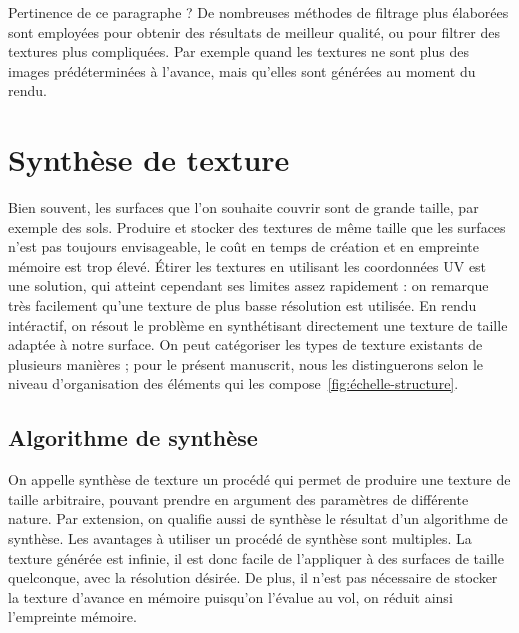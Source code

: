 {\color{red}Pertinence de ce paragraphe ?}
De nombreuses méthodes de filtrage plus élaborées sont employées pour obtenir des résultats de meilleur qualité, ou pour filtrer des textures plus compliquées. Par exemple quand les textures ne sont plus des images prédéterminées à l'avance, mais qu'elles sont générées au moment du rendu.

\section{Synthèse de texture}

Bien souvent, les surfaces que l'on souhaite couvrir sont de grande taille, par exemple des sols. Produire et stocker des textures de même taille que les surfaces n'est pas toujours envisageable, le coût en temps de création et en empreinte mémoire est trop élevé. Étirer les textures en utilisant les coordonnées UV est une solution, qui atteint cependant ses limites assez rapidement : on remarque très facilement qu'une texture de plus basse résolution est utilisée. En rendu intéractif, on résout le problème en synthétisant directement une texture de taille adaptée à notre surface. On peut catégoriser les types de texture existants de plusieurs manières ; pour le présent manuscrit, nous les distinguerons selon le niveau d'organisation des éléments qui les compose~\ref{fig:échelle-structure}.

\subsection*{Algorithme de synthèse}

On appelle synthèse de texture un procédé qui permet de produire une texture de taille arbitraire, pouvant prendre en argument des paramètres de différente nature. Par extension, on qualifie aussi de synthèse le résultat d'un algorithme de synthèse. Les avantages à utiliser un procédé de synthèse sont multiples. La texture générée est infinie, il est donc facile de l'appliquer à des surfaces de taille quelconque, avec la résolution désirée. De plus, il n'est pas nécessaire de stocker la texture d'avance en mémoire puisqu'on l'évalue au vol, on réduit ainsi l'empreinte mémoire.


\bigskip

